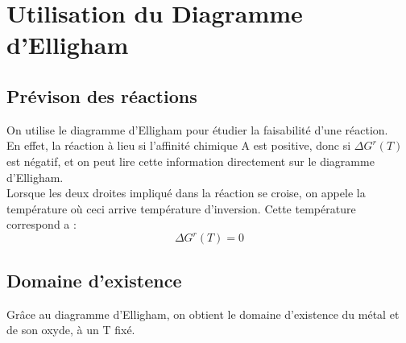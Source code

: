 \section{Utilisation du Diagramme d'Elligham}
\subsection{Prévison des réactions}
On utilise le diagramme d'Elligham pour étudier la faisabilité d'une réaction.\\
En effet, la réaction à lieu si l'affinité chimique A est positive, donc si $\Delta G^r(T)$ est négatif, et on peut lire cette information directement sur le diagramme d'Elligham.\\
Lorsque les deux droites impliqué dans la réaction se croise, on appele la température où ceci arrive température d'inversion. Cette température correspond a : 
$$\Delta G^r(T)=0$$
\subsection{Domaine d'existence}
Grâce au diagramme d'Elligham, on obtient le domaine d'existence du métal et de son oxyde, à un T fixé.
